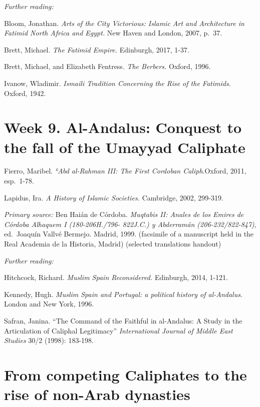 \documentclass[
]{book}
\begin{document}
\emph{Further reading:}

Bloom, Jonathan. \emph{Arts of the City Victorious: Islamic Art and Architecture in Fatimid North Africa and Egypt.} New Haven and London, 2007, p.~37.

Brett, Michael. \emph{The Fatimid Empire.} Edinburgh, 2017, 1-37.

Brett, Michael, and Elizabeth Fentress. \emph{The Berbers.} Oxford, 1996.

Ivanow, Wladimir. \emph{Ismaili Tradition Concerning the Rise of the Fatimids.} Oxford, 1942.

\hypertarget{week-9.-al-andalus-conquest-to-the-fall-of-the-umayyad-caliphate}{%
\chapter{Week 9. Al-Andalus: Conquest to the fall of the Umayyad Caliphate}\label{week-9.-al-andalus-conquest-to-the-fall-of-the-umayyad-caliphate}}

Fierro, Maribel. \emph{ʿAbd al-Rahman III: The First Cordoban Caliph}.Oxford, 2011, esp.~1-78.

Lapidus, Ira. \emph{A History of Islamic Societies.} Cambridge, 2002,
299-319.

\emph{Primary source:} Ben Haián de Córdoba. \emph{Muqtabis II: Anales de los Emires de Córdoba Alhaquem I (180-206H./796- 822J.C.) y Abderramán (206-232/822-847)}, ed.~Joaquín Vallvé Bermejo. Madrid, 1999. (facsimile of a manuscript held in the Real Academia de la Historia, Madrid) (selected translations handout)

\emph{Further reading:}

Hitchcock, Richard. \emph{Muslim Spain Reconsidered.} Edinburgh, 2014, 1-121.

Kennedy, Hugh. \emph{Muslim Spain and Portugal: a political history of al-Andalus}. London and New York, 1996.

Safran, Janina. ``The Command of the Faithful in al-Andalus: A Study in
the Articulation of Caliphal Legitimacy'' \emph{International Journal of Middle East Studies} 30/2 (1998): 183-198.

\hypertarget{from-competing-caliphates-to-the-rise-of-non-arab-dynasties}{%
\chapter{From competing Caliphates to the rise of non-Arab dynasties}\label{from-competing-caliphates-to-the-rise-of-non-arab-dynasties}}
\end{document}
